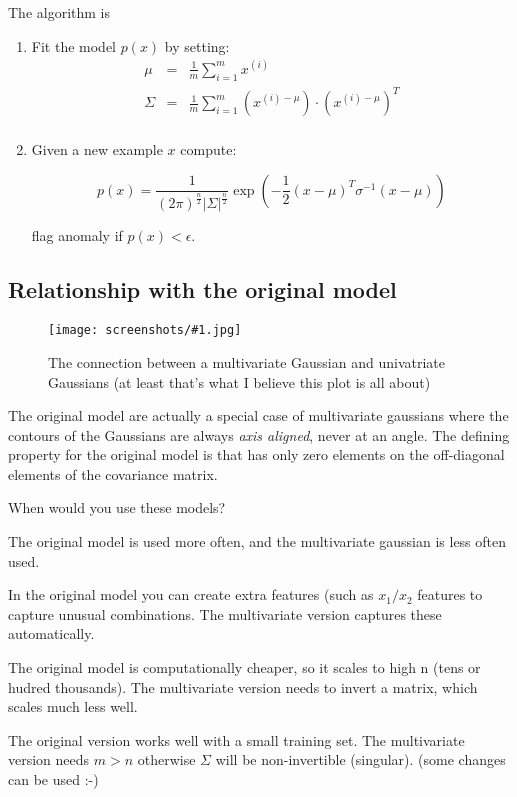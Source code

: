 \documentclass[a4, 12pt, english, USenglish]{scrreprt}
\newcommand{\screenshot}[2]{
\begin{figure}[htb]
\texttt{[image: screenshots/\#1.jpg]}
\label{#1}
\caption{#2}
\end{figure}}
\newcommand{\parens}[1]{\ensuremath{\left({#1}\right)}}
\newcommand{\idx}[1]{{\em #1}\index{#1}}
\begin{document}
The algorithm is

\begin{enumerate}
\item Fit the model \(p(x)\) by setting:
\[
\begin{array}{lcl}
\mu&=&\frac{1}{m} \sum_{i=1}^{m}x^{(i)} \\
\Sigma&=&\frac{1}{m} \sum_{i=1}^{m}(x^{(i)-\mu})\cdot(x^{(i)-\mu})^T \\
\end{array}
\]
\item Given a new example \(x\) compute:

\[
p(x) = \frac{1}{(2\pi) ^{\frac{n}{2}} |\Sigma|^{\frac{n}{2}}}
\exp\parens{-\frac{1}{2} (x - \mu)^T\sigma^{-1}(x - \mu)}
\]

flag anomaly if \(p(x) < \epsilon\).



\end{enumerate}

\subsection{Relationship with the original model}

\screenshot{newandolldgaussianmodel}{The connection between a
  multivariate Gaussian and univatriate Gaussians (at least that's
  what I believe this plot is all about)}



The original model are actually a special case of multivariate
gaussians where the contours of the Gaussians are always \idx{axis
  aligned}, never at an angle.  The defining property for the original
model is that has only zero elements on the off-diagonal elements of
the covariance matrix.

When would you use these models?

The original model is used more often,  and the multivariate gaussian
is less often used.

In the original model you can create extra features (such as
\(x_1/x_2\) features to capture  unusual combinations.  The
multivariate version captures these automatically.   

The original model is computationally cheaper, so it scales to high n
(tens or hudred thousands).  The multivariate version needs to invert
a matrix, which scales much less well.

The original version works well with a small training set.  The
multivariate version needs \(m>n\) otherwise \(\Sigma\) will be
non-invertible (singular). (some changes can be used :-)
\end{document}
